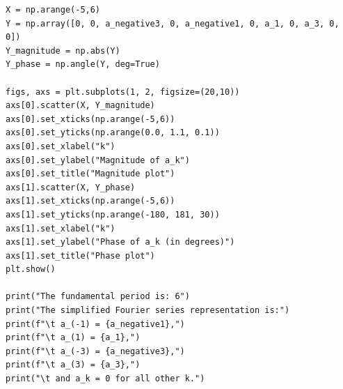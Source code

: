 \documentclass[10pt,a4paper, margin=1in]{article}
\begin{document}
\begin{enumerate}
\begin{lstlisting}
X = np.arange(-5,6)
Y = np.array([0, 0, a_negative3, 0, a_negative1, 0, a_1, 0, a_3, 0, 0])
Y_magnitude = np.abs(Y)
Y_phase = np.angle(Y, deg=True)

figs, axs = plt.subplots(1, 2, figsize=(20,10))
axs[0].scatter(X, Y_magnitude)
axs[0].set_xticks(np.arange(-5,6))
axs[0].set_yticks(np.arange(0.0, 1.1, 0.1))
axs[0].set_xlabel("k")
axs[0].set_ylabel("Magnitude of a_k")
axs[0].set_title("Magnitude plot")
axs[1].scatter(X, Y_phase)
axs[1].set_xticks(np.arange(-5,6))
axs[1].set_yticks(np.arange(-180, 181, 30))
axs[1].set_xlabel("k")
axs[1].set_ylabel("Phase of a_k (in degrees)")
axs[1].set_title("Phase plot")
plt.show() 

print("The fundamental period is: 6")
print("The simplified Fourier series representation is:")
print(f"\t a_(-1) = {a_negative1},")
print(f"\t a_(1) = {a_1},")
print(f"\t a_(-3) = {a_negative3},")
print(f"\t a_(3) = {a_3},")
print("\t and a_k = 0 for all other k.")
\end{lstlisting}

\end{enumerate}
\end{document}
